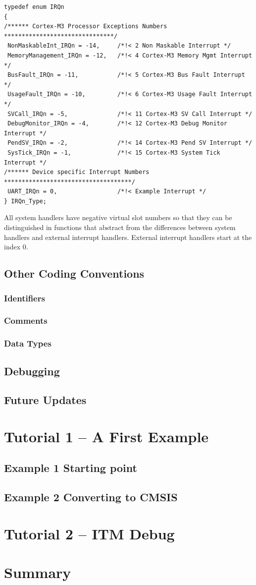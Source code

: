 \begin{lstlisting}[style=cpp,title=Listing shows the generic part of the
(\file{<device>.h}) file.] typedef enum IRQn
{
/****** Cortex-M3 Processor Exceptions Numbers *******************************/
 NonMaskableInt_IRQn = -14, 	/*!< 2 Non Maskable Interrupt */
 MemoryManagement_IRQn = -12, 	/*!< 4 Cortex-M3 Memory Mgmt Interrupt */
 BusFault_IRQn = -11, 			/*!< 5 Cortex-M3 Bus Fault Interrupt */
 UsageFault_IRQn = -10, 		/*!< 6 Cortex-M3 Usage Fault Interrupt */
 SVCall_IRQn = -5, 				/*!< 11 Cortex-M3 SV Call Interrupt */
 DebugMonitor_IRQn = -4, 		/*!< 12 Cortex-M3 Debug Monitor Interrupt */
 PendSV_IRQn = -2, 				/*!< 14 Cortex-M3 Pend SV Interrupt */
 SysTick_IRQn = -1, 			/*!< 15 Cortex-M3 System Tick Interrupt */
/****** Device specific Interrupt Numbers ************************************/
 UART_IRQn = 0, 				/*!< Example Interrupt */
} IRQn_Type;
\end{lstlisting}

All system handlers have negative virtual slot numbers so that they can be
distinguished in functions that abstract from the differences between system
handlers and external interrupt handlers. External interrupt handlers start at
the index 0.

\subsection{Other Coding Conventions}
\subsubsection{Identifiers}
\subsubsection{Comments}
\subsubsection{Data Types}
\subsection{Debugging}
\subsection{Future Updates}
\section{Tutorial 1 – A First Example}
\subsection{Example 1 Starting point}
\subsection{Example 2 Converting to CMSIS}
\section{Tutorial 2 – ITM Debug}
\section{Summary}



